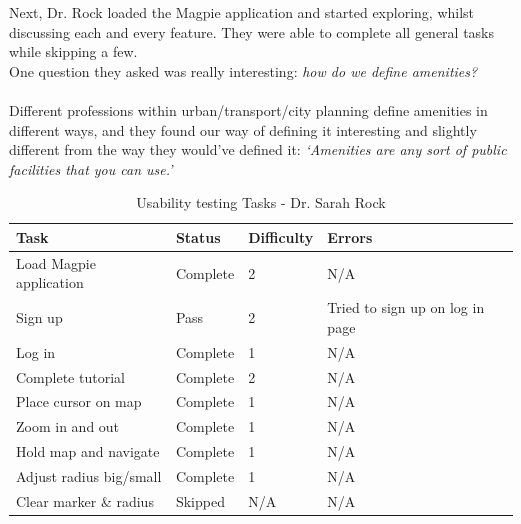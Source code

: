 \noindent Next, Dr. Rock loaded the Magpie application and started exploring, whilst discussing each and every feature. They were able to complete all general tasks while skipping a few.\\
One question they asked was really interesting: \emph{how do we define amenities?}\\ \\
Different professions within urban/transport/city planning define amenities in different ways, and they found our way of defining it interesting and slightly different from the way they would've defined it: \emph{`Amenities are any sort of public facilities that you can use.'}\\
\begin{table}[h!]
    \centering
    \caption{Usability testing Tasks - Dr. Sarah Rock}
    \begin{tabular}{|p{}|p{}|p{}|p{}|}
        \hline
        \textbf{Task}                 & \textbf{Status} & \textbf{Difficulty} & \textbf{Errors}                 \\
        \hline
        Load Magpie application       & Complete        & 2                   & N/A                             \\
        \hline
        Sign up                       & Pass            & 2                   & Tried to sign up on log in page \\
        \hline
        Log in                        & Complete        & 1                   & N/A                             \\
        \hline
        Complete tutorial             & Complete        & 2                   & N/A                             \\
        \hline
        Place cursor on map           & Complete        & 1                   & N/A                             \\
        \hline
        Zoom in and out               & Complete        & 1                   & N/A                             \\
        \hline
        Hold map and navigate         & Complete        & 1                   & N/A                             \\
        \hline
        Adjust radius big/small       & Complete        & 1                   & N/A                             \\
        \hline
        Clear marker \& radius        & Skipped         & N/A                 & N/A                             \\

\end{tabular}
\end{table}
